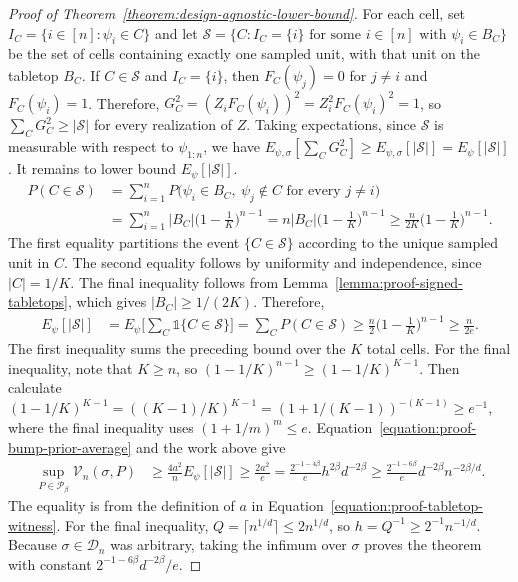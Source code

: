 \documentclass[letterpaper,12pt]{article}
\theoremstyle{definition}
\numberwithin{equation}{section}
\newcommand{\mc}{\mathcal}
\newcommand{\one}{\mathds{1}}
\begin{document}
\begin{proof}[Proof of Theorem~\ref{theorem:design-agnostic-lower-bound}]
For each cell, set $I_C=\{i\in[n]:\psi_i\in C\}$ and let $\mathcal S=\{C:I_C=\{i\}\text{ for some }i\in[n]\text{ with }\psi_i\in B_C\}$ be the set of cells containing exactly one sampled unit, with that unit on the tabletop $B_C$.
If $C\in\mathcal S$ and $I_C=\{i\}$, then $F_C(\psi_j)=0$ for $j\neq i$ and $F_C(\psi_i)=1$.
Therefore, $G_C^2=(Z_iF_C(\psi_i))^2=Z_i^2F_C(\psi_i)^2=1$, so $\sum_CG_C^2\geq|\mathcal S|$ for every realization of $Z$.
Taking expectations, since $\mathcal S$ is measurable with respect to $\psi_{1:n}$, we have $E_{\psi,\sigma}[\sum_CG_C^2]\geq E_{\psi,\sigma}[|\mathcal S|]=E_\psi[|\mathcal S|]$.
It remains to lower bound $E_\psi[|\mathcal S|]$.
\begin{align*}
P(C\in\mathcal S)&=\sum_{i=1}^nP\bigl(\psi_i\in B_C,\ \psi_j\notin C\text{ for every }j\neq i\bigr)\\
&=\sum_{i=1}^n|B_C|\bigg(1-\frac1K\bigg)^{n-1}=n|B_C|\bigg(1-\frac1K\bigg)^{n-1}\geq\frac{n}{2K}\bigg(1-\frac1K\bigg)^{n-1}.
\end{align*}
The first equality partitions the event $\{C\in\mathcal S\}$ according to the unique sampled unit in $C$.
The second equality follows by uniformity and independence, since $|C|=1/K$.
The final inequality follows from Lemma~\ref{lemma:proof-signed-tabletops}, which gives $|B_C|\geq1/(2K)$.
Therefore,
\begin{align*}
E_\psi[|\mathcal S|]&=E_\psi\bigg[\sum_C\one\{C\in\mathcal S\}\bigg]=\sum_CP(C\in\mathcal S) \geq\frac n2\bigg(1-\frac1K\bigg)^{n-1}\geq\frac{n}{2e}.
\end{align*}
The first inequality sums the preceding bound over the $K$ total cells.
For the final inequality, note that $K\geq n$, so $(1-1/K)^{n-1}\geq(1-1/K)^{K-1}$.
Then calculate $(1-1/K)^{K-1}=((K-1)/K)^{K-1}=(1+1/(K-1))^{-(K-1)}\geq e^{-1}$, where the final inequality uses $(1+1/m)^m\leq e$.
Equation~\eqref{equation:proof-bump-prior-average} and the work above give
\begin{align*}
\sup_{P\in\mathcal P_\beta}\mc V_n(\sigma,P)&\geq\frac{4a^2}{n}E_\psi[|\mathcal S|]\geq\frac{2a^2}{e} =\frac{2^{-1-4\beta}}{e}h^{2\beta}d^{-2\beta}\geq\frac{2^{-1-6\beta}}{e}d^{-2\beta}n^{-2\beta/d}.
\end{align*}
The equality is from the definition of $a$ in Equation~\eqref{equation:proof-tabletop-witness}.
For the final inequality, $Q=\lceil n^{1/d}\rceil\leq2n^{1/d}$, so $h=Q^{-1}\geq2^{-1}n^{-1/d}$.
Because $\sigma\in\mathcal D_n$ was arbitrary, taking the infimum over $\sigma$ proves the theorem with constant $2^{-1-6\beta}d^{-2\beta}/e$.
\end{proof}
\end{document}
